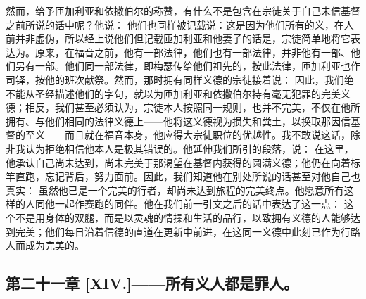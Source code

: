 然而，给予匝加利亚和依撒伯尔的称赞，有什么不是包含在宗徒关于自己未信基督之前所说的话中呢？他说： 他们也同样被记载说：这是因为他们所有的义，在人前并非虚伪，所以经上说他们但记载匝加利亚和他妻子的话是，宗徒简单地将它表达为。原来，在福音之前，他有一部法律，他们也有一部法律，并非他有一部、他们另有一部。他们同一部法律，即梅瑟传给他们祖先的，按此法律，匝加利亚也作司铎，按他的班次献祭。然而，那时拥有同样义德的宗徒接着说： 因此，我们绝不能从圣经描述他们的字句，就以为匝加利亚和依撒伯尔持有毫无犯罪的完美义德；相反，我们甚至必须认为，宗徒本人按照同一规则，也并不完美，不仅在他所拥有、与他们相同的法律义德上——他将这义德视为损失和粪土，以换取那因信基督的至义——而且就在福音本身，他应得大宗徒职位的优越性。我不敢说这话，除非我认为拒绝相信他本人是极其错误的。他延伸我们所引的段落，说： 在这里，他承认自己尚未达到，尚未完美于那渴望在基督内获得的圆满义德；他仍在向着标竿直跑，忘记背后，努力面前。因此，我们知道他在别处所说的话甚至对他自己也真实： 虽然他已是一个完美的行者，却尚未达到旅程的完美终点。他愿意所有这样的人同他一起作赛跑的同伴。他在我们前一引文之后的话中表达了这一点： 这个不是用身体的双腿，而是以灵魂的情操和生活的品行，以致拥有义德的人能够达到完美；他们每日沿着信德的直道在更新中前进，在这同一义德中此刻已作为行路人而成为完美的。\par


\subsection{第二十一章 [XIV.]——所有义人都是罪人。}


